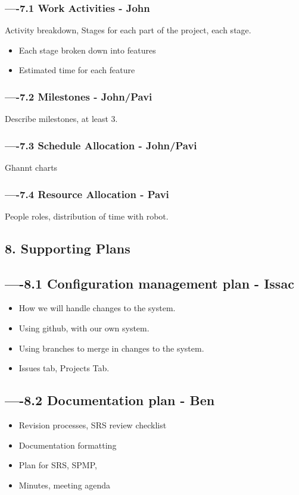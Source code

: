\documentclass[11pt, a4paper]{article}
\begin{document}
	\subsubsection*{----7.1 Work Activities - John}
	Activity breakdown, Stages for each part of the project, each stage.
	\begin{itemize}
		\item Each stage broken down into features
		\item Estimated time for each feature
	\end{itemize}

	\subsubsection*{----7.2 Milestones - John/Pavi}
	Describe milestones, at least 3.
	\subsubsection*{----7.3 Schedule Allocation - John/Pavi}
	Ghannt charts
	\subsubsection*{----7.4 Resource Allocation - Pavi}
	People roles, distribution of time with robot.
		
	\subsection*{8. Supporting Plans}
	\subsection*{----8.1 Configuration management plan - Issac}
	\begin{itemize}
	\item How we will handle changes to the system.
	\item Using github, with our own system.
	\item Using branches to merge in changes to the system.
	\item Issues tab, Projects Tab.
	\end{itemize}	
	
	\subsection*{----8.2 Documentation plan - Ben}
	\begin{itemize}
	\item Revision processes, SRS review checklist
	\item Documentation formatting
	\item Plan for SRS, SPMP,
	\item Minutes, meeting agenda
	\end{itemize}	
	
\end{document}
